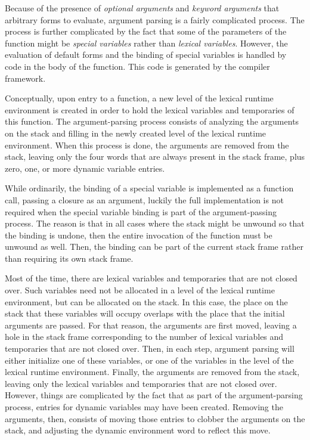 Because of the presence of \emph{optional arguments} and \emph{keyword
  arguments} that arbitrary forms to evaluate, argument parsing is a
fairly complicated process.  The process is further complicated by the
fact that some of the parameters of the function might be
\emph{special variables} rather than \emph{lexical variables}.
However, the evaluation of default forms and the binding of special
variables is handled by code in the body of the function.  This code
is generated by the \cleavir{} compiler framework.

Conceptually, upon entry to a function, a new level of the lexical
runtime environment is created in order to hold the lexical variables
and temporaries of this function.  The argument-parsing process
consists of analyzing the arguments on the stack and filling in the
newly created level of the lexical runtime environment.  When this
process is done, the arguments are removed from the stack, leaving
only the four words that are always present in the stack frame, plus
zero, one, or more dynamic variable entries.

While ordinarily, the binding of a special variable is implemented as
a function call, passing a closure as an argument, luckily the full
implementation is not required when the special variable binding is
part of the argument-passing process.  The reason is that in all cases
where the stack might be unwound so that the binding is undone, then
the entire invocation of the function must be unwound as well.  Then,
the binding can be part of the current stack frame rather than
requiring its own stack frame.

Most of the time, there are lexical variables and temporaries that are
not closed over.  Such variables need not be allocated in a level of
the lexical runtime environment, but can be allocated on the stack.
In this case, the place on the stack that these variables will occupy
overlaps with the place that the initial arguments are passed.  For
that reason, the arguments are first moved, leaving a hole in the
stack frame corresponding to the number of lexical variables and
temporaries that are not closed over.  Then, in each step, argument
parsing will either initialize one of these variables, or one of the
variables in the level of the lexical runtime environment.  Finally,
the arguments are removed from the stack, leaving only the lexical
variables and temporaries that are not closed over.  However, things
are complicated by the fact that as part of the argument-parsing
process, entries for dynamic variables may have been created.
Removing the arguments, then, consists of moving those entries to
clobber the arguments on the stack, and adjusting the dynamic
environment word to reflect this move.


